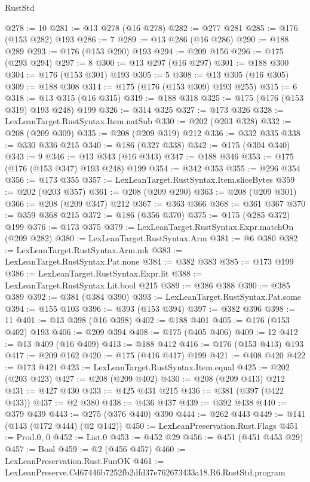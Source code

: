 \begin{lexlean}{RustStd}
\begin{coremodule}
@278 := 10
@281 := @13 @278 (@16 @278)
@282 := @277 @281
@285 := @176 (@153 @282) @193
@286 := 7
@289 := @13 @286 (@16 @286)
@290 := @188 @289
@293 := @176 (@153 @290) @193
@294 := @209 @156
@296 := @175 (@293 @294)
@297 := 8
@300 := @13 @297 (@16 @297)
@301 := @188 @300
@304 := @176 (@153 @301) @193
@305 := 5
@308 := @13 @305 (@16 @305)
@309 := @188 @308
@314 := @175 (@176 (@153 @309) @193 @255)
@315 := 6
@318 := @13 @315 (@16 @315)
@319 := @188 @318
@325 := @175 (@176 (@153 @319) @193 @248) @199
@326 := @314 @325
@327 := @173 @326
@328 := LexLeanTarget.RustSyntax.Item.natSub
@330 := @202 (@203 @328)
@332 := @208 (@209 @309)
@335 := @208 (@209 @319) @212
@336 := @332 @335
@338 := @330 @336 @215
@340 := @186 (@327 @338)
@342 := @175 (@304 @340)
@343 := 9
@346 := @13 @343 (@16 @343)
@347 := @188 @346
@353 := @175 (@176 (@153 @347) @193 @248) @199
@354 := @342 @353
@355 := @296 @354
@356 := @173 @355
@357 := LexLeanTarget.RustSyntax.Item.sliceBytes
@359 := @202 (@203 @357)
@361 := @208 (@209 @290)
@363 := @208 (@209 @301)
@366 := @208 (@209 @347) @212
@367 := @363 @366
@368 := @361 @367
@370 := @359 @368 @215
@372 := @186 (@356 @370)
@375 := @175 (@285 @372) @199
@376 := @173 @375
@379 := LexLeanTarget.RustSyntax.Expr.matchOn (@209 @282)
@380 := LexLeanTarget.RustSyntax.Arm
@381 := @6 @380
@382 := LexLeanTarget.RustSyntax.Arm.mk
@383 := LexLeanTarget.RustSyntax.Pat.none
@384 := @382 @383
@385 := @173 @199
@386 := LexLeanTarget.RustSyntax.Expr.lit
@388 := LexLeanTarget.RustSyntax.Lit.bool @215
@389 := @386 @388
@390 := @385 @389
@392 := @381 (@384 @390)
@393 := LexLeanTarget.RustSyntax.Pat.some
@394 := @155 @103
@396 := @393 (@153 @394)
@397 := @382 @396
@398 := 11
@401 := @13 @398 (@16 @398)
@402 := @188 @401
@405 := @176 (@153 @402) @193
@406 := @209 @394
@408 := @175 (@405 @406)
@409 := 12
@412 := @13 @409 (@16 @409)
@413 := @188 @412
@416 := @176 (@153 @413) @193
@417 := @209 @162
@420 := @175 (@416 @417) @199
@421 := @408 @420
@422 := @173 @421
@423 := LexLeanTarget.RustSyntax.Item.equal
@425 := @202 (@203 @423)
@427 := @208 (@209 @402)
@430 := @208 (@209 @413) @212
@431 := @427 @430
@433 := @425 @431 @215
@436 := @381 (@397 (@422 @433))
@437 := @2 @380
@438 := @436 @437
@439 := @392 @438
@440 := @379 @439
@443 := @275 (@376 @440) @390
@444 := @262 @443
@449 := @141 (@143 (@172 @444) (@2 @142))
@450 := LexLeanPreservation.Rust.Flags
@451 := Prod.{0, 0}
@452 := List.{0}
@453 := @452 @29
@456 := @451 (@451 @453 @29)
@457 := Bool
@459 := @2 (@456 @457)
@460 := LexLeanPreservation.Rust.FunOK
@461 := LexLeanPreserve.Cd67446b7252fb2dfd37e762673433a18.R6.RustStd.program

\end{coremodule}
\end{lexlean}
